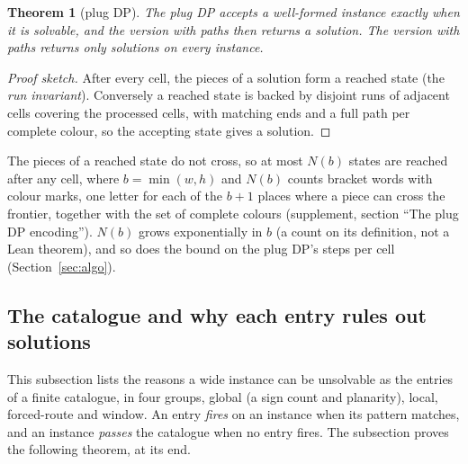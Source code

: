 \documentclass[11pt]{article}
\makeatletter
\newtheorem{theorem}{Theorem}
\newcommand{\secmark}[1]{\pdfsavepos\protected@write\@auxout{}{\string\secpos{#1}{\thepage}{\noexpand\the\noexpand\pdflastypos}}}
\def\secpos#1#2#3{}
\makeatother
\begin{document}
\begin{theorem}[plug DP]\label{thm:thin}
The plug DP accepts a well-formed instance exactly when it is solvable, and the version with paths
then returns a solution. The version with paths returns only solutions on every instance.
\end{theorem}
\begin{proof}[Proof sketch]
After every cell, the pieces of a solution form a reached state (the \emph{run invariant}).
Conversely a reached state is backed by disjoint runs of adjacent cells covering the processed
cells, with matching ends and a full path per complete colour, so the accepting state gives a
solution.
\end{proof}

The pieces of a reached state do not cross, so at most $N(b)$ states are reached after any cell,
where $b=\min(w,h)$ and $N(b)$ counts bracket words with colour marks, one letter for each of the
$b+1$ places where a piece can cross the frontier, together with the set of complete colours
(supplement, section ``The plug DP encoding''). $N(b)$ grows exponentially in $b$ (a
count on its definition, not a Lean theorem), and so does the bound on the plug DP's steps per
cell (Section~\ref{sec:algo}).

\secmark{cat}
\subsection{The catalogue and why each entry rules out solutions}\label{sec:cat}

This subsection lists the reasons a wide instance can be unsolvable as the entries of a finite
catalogue, in four groups, global (a sign count and planarity), local, forced-route and window. An
entry \emph{fires} on an instance when its pattern matches, and an instance \emph{passes} the
catalogue when no entry fires. The subsection proves the following theorem, at its end.
\end{document}
